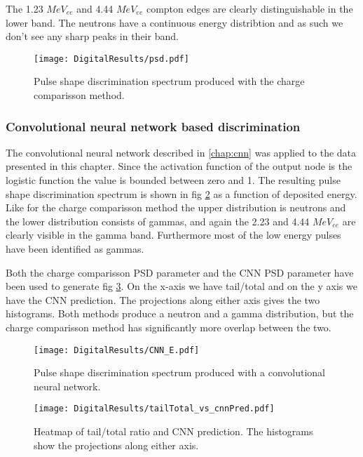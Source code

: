\documentclass[main.tex]{subfiles}
\begin{document}
The 1.23 $MeV_{ee}$ and 4.44 $MeV_{ee}$ compton edges are clearly distinguishable in the lower band. The neutrons have a continuous energy distribtion and as such we don't see any sharp peaks in their band. 

\begin{figure}[ht!]
    \centering
        \texttt{[image: DigitalResults/psd.pdf]}
        \caption{Pulse shape discrimination spectrum produced with the charge comparisson method.}
        \label{fig:psd_d}
\end{figure}

\subsubsection{Convolutional neural network based discrimination}
The convolutional neural network described in \ref{chap:cnn} was applied to the data presented in this chapter. Since the activation function of the output node is the logistic function the value is bounded between zero and 1. The resulting pulse shape discrimination spectrum is shown in fig \ref{fig:cnn_E} as a function of deposited energy. Like for the charge comparisson method the upper distribution is neutrons and the lower distribution consists of gammas, and again the 2.23 and 4.44 $MeV_{ee}$ are clearly visible in the gamma band. Furthermore most of the low energy pulses have been identified as gammas.

Both the charge comparisson PSD parameter and the CNN PSD parameter have been used to generate fig \ref{fig:cc_cnn}. On the x-axis we have tail/total and on the y axis we have the CNN prediction. The projections along either axis gives the two histograms. Both methods produce a neutron and a gamma distribution, but the charge comparisson method has significantly more overlap between the two.

\begin{figure}[ht!]
    \centering
        \texttt{[image: DigitalResults/CNN\_E.pdf]}
        \caption{Pulse shape discrimination spectrum produced with a convolutional neural network.}
    \label{fig:cnn_E} 
\end{figure}

\begin{figure}[ht!]
    \centering
        \texttt{[image: DigitalResults/tailTotal\_vs\_cnnPred.pdf]}
        \caption{Heatmap of tail/total ratio and CNN prediction. The histograms show the projections along either axis.}
    \label{fig:cc_cnn} 
\end{figure}
\end{document}
